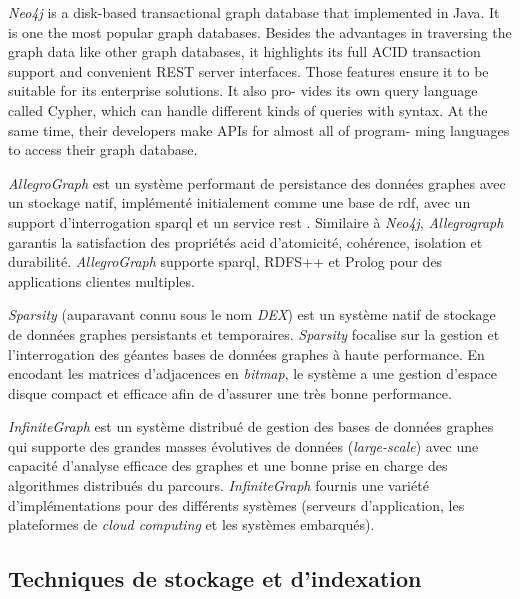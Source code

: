\begin{itemize}
    \emph{Neo4j} \cite{neo4j} is a disk-based transactional graph
    database that implemented in Java. It is one the most popular
    graph databases. Besides the advantages in traversing the graph
    data like other graph databases, it highlights its full ACID
    transaction support and convenient REST server interfaces. Those
    features ensure it to be suitable for its enterprise solutions. It
    also pro- vides its own query language called Cypher, which can
    handle different kinds of queries with syntax. At the same time,
    their developers make APIs for almost all of program- ming
    languages to access their graph database.

    \emph{AllegroGraph} \cite{allegrograph} est un système performant
    de persistance des données graphes avec un stockage natif,
    implémenté initialement comme une base de \acrshort{rdf}, avec un
    support d'interrogation \acrshort{sparql} et un service
    \acrshort{rest} \cite{fielding2000architectural}. Similaire à
    \emph{Neo4j}, \emph{Allegrograph} garantis la satisfaction des
    propriétés \acrshort{acid} d'atomicité, cohérence, isolation et
    durabilité. \emph{AllegroGraph} supporte \acrshort{sparql}, RDFS++
    et Prolog pour des applications clientes multiples.

    \emph{Sparsity} \cite{sparksee} (auparavant connu sous le nom
    \emph{DEX}) est un système natif de stockage de données graphes
    persistants et temporaires. \emph{Sparsity} focalise sur la
    gestion et l'interrogation des géantes bases de données graphes à
    haute performance. En encodant les matrices d'adjacences en
    \emph{bitmap}, le système a une gestion d'espace disque compact et
    efficace afin de d'assurer une très bonne performance.

    \emph{InfiniteGraph} \cite{infinitegraph} est un système distribué
    de gestion des bases de données graphes qui supporte des grandes
    masses évolutives de données (\emph{large-scale}) avec une
    capacité d'analyse efficace des graphes et une bonne prise en
    charge des algorithmes distribués du parcours. \emph{InfiniteGraph}
    fournis une variété d'implémentations pour des différents systèmes
    (serveurs d'application, les plateformes de \emph{cloud computing}
    et les systèmes embarqués).

    \subsection{Techniques de stockage et d'indexation}
    \label{sec:graph-internals}


\end{itemize}
